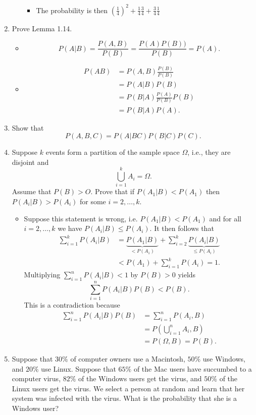 \documentclass{article}
\begin{document}
\begin{enumerate}
\begin{enumerate}
\begin{itemize}
					\item The probability is then $\left(\frac{1}{4}\right)^2 + \frac{1}{4} \frac{3}{4} + \frac{3}{4}\frac{1}{4}$
				\end{itemize}
		\end{enumerate}
	\item Prove Lemma 1.14.
		\begin{itemize}
			\item
			$$
			P(A|B) = \frac{P(A, B)}{P(B)} = \frac{P(A)P(B))}{P(B)} = P(A).
			$$
			\item
			$$
			\begin{aligned}
			P(AB) &= P(A, B) \frac{P(B)}{P(B)} \\
			&= P(A|B) P(B) \\
			& = P(B|A) \frac{P(A)}{P(B)} P(B) \\
			&= P(B|A)P(A).
			\end{aligned}
			$$
		\end{itemize}
	\item Show that
	$$
	P(A, B, C) = P(A|BC)P(B|C)P(C).
	$$
	\item Suppose $k$ events form a partition of the sample space $\Omega$, i.e., they are disjoint and 
	$$
	\bigcup_{i = 1}^k A_i = \Omega.
	$$
	Assume that $P(B) > O$. Prove that if $P(A_1|B) < P(A_1)$ then $P(A_i|B) > P(A_i)$ for some $i = 2, \dots, k$.
		\begin{itemize}
			\item Suppose this statement is wrong, i.e. $P(A_1|B) < P(A_1)$ and for all $i = 2, \dots, k$ we have $P(A_i|B) \leq P(A_i)$. It then follows that
			$$
			\begin{aligned}
			\sum_{i = 1}^k P(A_i|B) &= \underbrace{P(A_1|B)}_{< P(A_1)} + \sum_{i = 2}^k \underbrace{P(A_i|B)}_{\leq P(A_i)} \\
			&< P(A_1) + \sum_{i = 1}^k P(A_i) = 1.
			\end{aligned}
			$$
			Multiplying $\sum_{i = 1}^n P(A_i|B) < 1$ by $P(B) > 0$ yields
			$$
			\sum_{i = 1}^n P(A_i|B)P(B) < P(B).
			$$
			This is a contradiction because
			$$
			\begin{aligned}
			\sum_{i = 1}^n P(A_i|B)P(B) &= \sum_{i = 1}^n P(A_i, B) \\
			&= P\left(\bigcup_{i = 1}^n A_i , B\right) \\
			&= P(\Omega, B) = P(B).
			\end{aligned}
			$$
		\end{itemize}
	\item Suppose that $30\%$ of computer owners use a Macintosh, $50\%$ use Windows, and $20\%$ use Linux. Suppose that $65\%$ of the Mac users have succumbed to a computer virus, $82\%$ of the Windows users get the virus, and $50\%$ of the Linux users get the virus. We select a person at random and learn that her system was infected with the virus. What is the probability that she is a Windows user?

\end{enumerate}
\end{document}
